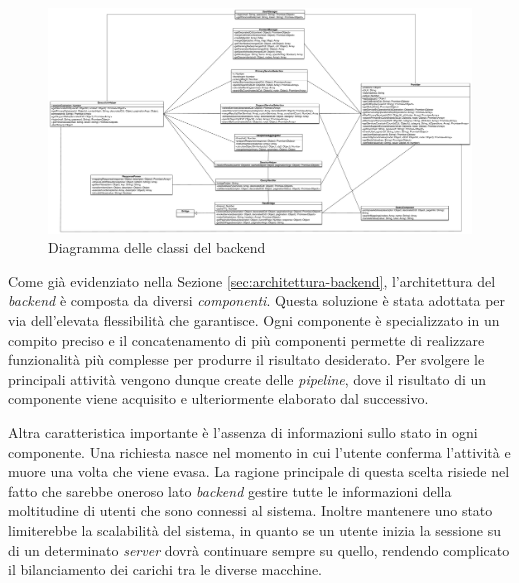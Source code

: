 \begin{figure}[p]
	\centering
	\includegraphics[height=\textwidth, width=\textheight, angle=90]{5-implementazione-backend/Immagini/diagramma_classi_backend.pdf}
	\caption{Diagramma delle classi del backend}\label{fig:class-diagram-backend}
\end{figure}

Come già evidenziato nella Sezione \ref{sec:architettura-backend}, l'architettura del \emph{backend} è composta da diversi \emph{componenti}. Questa soluzione è stata adottata per via dell'elevata flessibilità che garantisce. Ogni componente è specializzato in un compito preciso e il concatenamento di più componenti permette di realizzare funzionalità più complesse per produrre il risultato desiderato. Per svolgere le principali attività vengono dunque create delle \emph{pipeline}, dove il risultato di un componente viene acquisito e ulteriormente elaborato dal successivo.

Altra caratteristica importante è l'assenza di informazioni sullo stato in ogni componente. Una richiesta nasce nel momento in cui l'utente conferma l'attività e muore una volta che viene evasa. La ragione principale di questa scelta risiede nel fatto che sarebbe oneroso lato \emph{backend} gestire tutte le informazioni della moltitudine di utenti che sono connessi al sistema. Inoltre mantenere uno stato limiterebbe la scalabilità del sistema, in quanto se un utente inizia la sessione su di un determinato \emph{server} dovrà continuare sempre su quello, rendendo complicato il bilanciamento dei carichi tra le diverse macchine.

